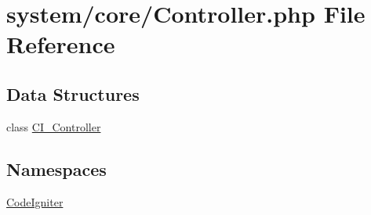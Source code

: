 \hypertarget{_controller_8php}{\section{system/core/\-Controller.php File Reference}
\label{_controller_8php}
}
\subsection*{Data Structures}
\begin{DoxyCompactItemize}
\item 
class \hyperlink{class_c_i___controller}{C\-I\-\_\-\-Controller}
\end{DoxyCompactItemize}
\subsection*{Namespaces}
\begin{DoxyCompactItemize}
\item 
\hyperlink{namespace_code_igniter}{Code\-Igniter}
\end{DoxyCompactItemize}
